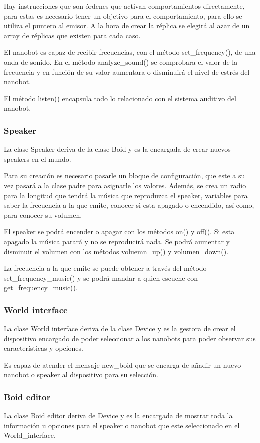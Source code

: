 Hay instrucciones que son órdenes que activan comportamientos directamente, para estas es necesario tener un objetivo para el comportamiento, para ello se utiliza el puntero al emisor. A la hora de crear la réplica se elegirá al azar de un array de réplicas que existen para cada caso.
 
El nanobot es capaz de recibir frecuencias, con el método set\_frequency(), de una onda de sonido. En el método analyze\_sound() se comprobara el valor de la frecuencia y en función de su valor aumentara o disminuirá el nivel de estrés del nanobot.


El método listen() encapsula todo lo relacionado con el sistema auditivo del nanobot.

\subsubsection{Speaker}
\label{sec:speaker}

La clase Speaker deriva de la clase Boid y es la encargada de crear nuevos speakers en el mundo.

Para su creación es necesario pasarle un bloque de configuración, que este a su vez pasará a la clase padre para asignarle los valores. Además, se crea un radio para la longitud que tendrá la música que reproduzca el speaker, variables para saber la frecuencia a la que emite, conocer si esta apagado o encendido, así como, para conocer su volumen.

El speaker se podrá encender o apagar con los métodos on() y off(). Si esta apagado la música parará y no se reproducirá nada. Se podrá aumentar y disminuir el volumen con los métodos voluemn\_up() y volumen\_down().

La frecuencia a la que emite se puede obtener a través del método set\_frequency\_music() y se podrá mandar a quien escuche con get\_frequency\_music().

\subsubsection{World interface}
\label{sec:world_interface}
La clase World interface deriva de la clase Device y es la gestora de crear el dispositivo encargado de poder seleccionar a los nanobots para poder observar sus características y opciones.

Es capaz de atender el mensaje new\_boid que se encarga de añadir un nuevo nanobot o speaker al dispositivo para su selección. 

\subsubsection{Boid editor}
\label{sec:boid_editor}
La clase Boid editor deriva de Device y es la encargada de mostrar toda la información u opciones para el speaker o nanobot que este seleccionado en el World\_interface. 


